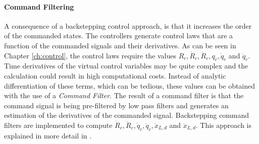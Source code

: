 \paragraph{Command Filtering}
A consequence of a backstepping control approach, is that it increases the order of the commanded states. 
The controllers generate control laws that are a function of the commanded signals and their derivatives.
As can be seen in Chapter \ref{ch:control}, the control laws require the values $ R_c, \dot{R}_c, \ddot{R}_c, q_c, \dot{q}_c $ and $ \ddot{q}_c $.
Time derivatives of the virtual control variables may be quite complex and the calculation could result in high computational costs.
Instead of analytic differentiation of these terms, which can be tedious, these values can be obtained with the use of a \textit{Command Filter}\cite{Farrell2008,Farrell2005}. 
The result of a command filter is that the command signal is being pre-filtered by low pass filters and generates an estimation of the derivatives of the commanded signal. Backstepping command filters are implemented to compute $ \dot{R}_c, \ddot{R}_c,\dot{q}_c, \ddot{q}_c,\dot{x}_{L,d}$ and $\ddot{x}_{L,d} $. 
This approach is explained in more detail in \cite{Borra2012}.

